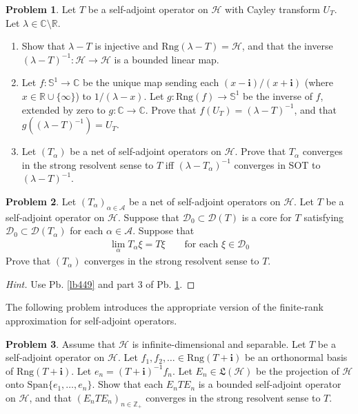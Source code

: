 \documentclass[12pt,b5paper,notitlepage]{article}
\theoremstyle{definition}
\newtheorem{prob}{\color{red}Problem}[section]
\theoremstyle{plain}
\newcommand{\fk}{\mathfrak}
\newcommand{\Dom}{\mathscr{D}}
\newcommand{\Span}{\mathrm{Span}}
\newcommand{\im}{\mathbf{i}}
\newcommand{\Cbb}{\mathbb C}
\newcommand{\Zbb}{\mathbb Z}
\newcommand{\Rbb}{\mathbb R}
\newcommand{\Rng}{\mathrm{Rng}}
\newcommand{\Sbb}{{\mathbb S}}
\newcommand{\MH}{\mathcal H}
\newcommand{\SA}{\mathscr A}
\numberwithin{equation}{section}
\begin{document}
\begin{prob}\label{lb450}
Let $T$ be a self-adjoint operator on $\MH$ with Cayley transform $U_T$. Let $\lambda\in\Cbb\setminus\Rbb$.
\begin{enumerate}
\item Show that $\lambda-T$ is injective and $\Rng(\lambda-T)=\MH$, and that the inverse $(\lambda-T)^{-1}:\MH\rightarrow\MH$ is a bounded linear map.
\item Let $f:\Sbb^1\rightarrow\Cbb$ be the unique map sending each $(x-\im)/(x+\im)$ (where $x\in\Rbb\cup\{\infty\}$) to $1/(\lambda-x)$. Let $g:\Rng(f)\rightarrow\Sbb^1$ be the inverse of $f$, extended by zero to $g:\Cbb\rightarrow\Cbb$. Prove that $f(U_T)=(\lambda-T)^{-1}$, and that $g((\lambda-T)^{-1})=U_T$.
\item Let $(T_\alpha)$ be a net of self-adjoint operators on $\MH$. Prove that $T_\alpha$ converges in the strong resolvent sense to $T$ iff $(\lambda-T_\alpha)^{-1}$ converges in SOT to $(\lambda-T)^{-1}$.
\end{enumerate}
\end{prob}

\begin{prob}\label{lb451}
Let $(T_\alpha)_{\alpha\in\SA}$ be a net of self-adjoint operators on $\MH$. Let $T$ be a self-adjoint operator on $\MH$. Suppose that $\Dom_0\subset\Dom(T)$ is a core for $T$ satisfying $\Dom_0\subset\Dom(T_\alpha)$ for each $\alpha\in\SA$. Suppose that
\begin{align*}
\lim_\alpha T_\alpha\xi=T\xi\qquad\text{for each }\xi\in\Dom_0
\end{align*}
Prove that $(T_\alpha)$ converges in the strong resolvent sense to $T$.
\end{prob}


\begin{proof}[Hint]
Use Pb. \ref{lb449} and part 3 of Pb. \ref{lb450}.
\end{proof}


The following problem introduces the appropriate version of the finite-rank approximation for self-adjoint operators.

\begin{prob}
Assume that $\MH$ is infinite-dimensional and separable. Let $T$ be a self-adjoint operator on $\MH$. Let $f_1,f_2,\dots\in\Rng(T+\im)$ be an orthonormal basis of $\Rng(T+\im)$. Let $e_n=(T+\im)^{-1}f_n$. Let $E_n\in\fk L(\MH)$ be the projection of $\MH$ onto $\Span\{e_1,\dots,e_n\}$. Show that each $E_nTE_n$ is a bounded self-adjoint operator on $\MH$, and that $(E_nTE_n)_{n\in\Zbb_+}$ converges in the strong resolvent sense to $T$. 
\end{prob}
\end{document}
